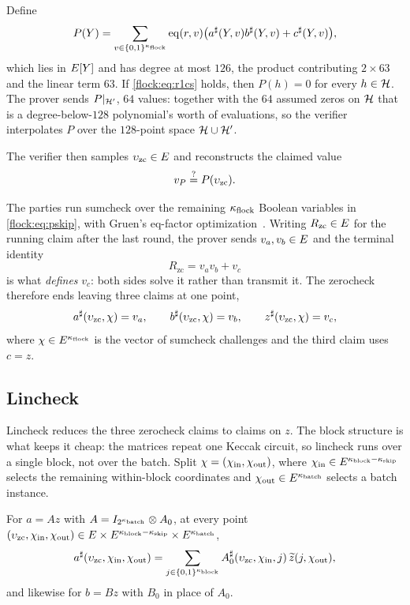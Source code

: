 Define
\begin{equation}\label{flock:eq:pskip}
P(Y)=\sum_{v\in\{0,1\}^{\kappa_{\mathrm{flock}}}}\operatorname{eq}(r,v)\bigl(a^{\sharp}(Y,v)b^{\sharp}(Y,v)+c^{\sharp}(Y,v)\bigr),
\end{equation}
which lies in $E[Y]$ and has degree at most $126$, the product contributing $2\times 63$ and the linear term $63$. If \eqref{flock:eq:r1cs} holds, then $P(h)=0$ for every $h\in\mathcal{H}$. The prover sends $P|_{\mathcal{H}'}$, $64$ values: together with the $64$ assumed zeros on $\mathcal{H}$ that is a degree-below-$128$ polynomial's worth of evaluations, so the verifier interpolates $P$ over the $128$-point space $\mathcal{H}\cup\mathcal{H}'$.

The verifier then samples $\upsilon_{\mathrm{zc}}\in E$ and reconstructs the claimed value
\[
v_P \stackrel{?}{=} P(\upsilon_{\mathrm{zc}}).
\]

The parties run sumcheck over the remaining $\kappa_{\mathrm{flock}}$ Boolean variables in \eqref{flock:eq:pskip}, with Gruen's eq-factor optimization~\cite{Gru24}. Writing $R_{\mathrm{zc}}\in E$ for the running claim after the last round, the prover sends $v_a,v_b\in E$ and the terminal identity
\begin{equation}\label{flock:eq:zc-terminal}
R_{\mathrm{zc}}=v_av_b+v_c
\end{equation}
is what \emph{defines} $v_c$: both sides solve it rather than transmit it. The zerocheck therefore ends leaving three claims at one point,
\begin{equation}\label{flock:eq:zc-claims}
a^{\sharp}(\upsilon_{\mathrm{zc}},\chi)=v_a,\qquad b^{\sharp}(\upsilon_{\mathrm{zc}},\chi)=v_b,\qquad z^{\sharp}(\upsilon_{\mathrm{zc}},\chi)=v_c,
\end{equation}
where $\chi\in E^{\kappa_{\mathrm{flock}}}$ is the vector of sumcheck challenges and the third claim uses $c=z$.

\subsection{Lincheck}\label{flock:lincheck}

Lincheck reduces the three zerocheck claims to claims on $z$. The block structure is what keeps it cheap: the matrices repeat one Keccak circuit, so lincheck runs over a single block, not over the batch. Split $\chi=(\chi_{\mathrm{in}},\chi_{\mathrm{out}})$, where $\chi_{\mathrm{in}}\in E^{\kappa_{\mathrm{block}}-\kappa_{\mathrm{skip}}}$ selects the remaining within-block coordinates and $\chi_{\mathrm{out}}\in E^{\kappa_{\mathrm{batch}}}$ selects a batch instance.

\begin{lemma}\label{lem:flock-block-diagonal}
For $a=Az$ with $A=I_{2^{\kappa_{\mathrm{batch}}}}\otimes A_0$, at every point $(\upsilon_{\mathrm{zc}},\chi_{\mathrm{in}},\chi_{\mathrm{out}})\in E\times E^{\kappa_{\mathrm{block}}-\kappa_{\mathrm{skip}}}\times E^{\kappa_{\mathrm{batch}}}$,
\[
a^{\sharp}(\upsilon_{\mathrm{zc}},\chi_{\mathrm{in}},\chi_{\mathrm{out}})=\sum_{j\in\{0,1\}^{\kappa_{\mathrm{block}}}}A^{\sharp}_0(\upsilon_{\mathrm{zc}},\chi_{\mathrm{in}},j)\,\widetilde{z}(j,\chi_{\mathrm{out}}),
\]
and likewise for $b=Bz$ with $B_0$ in place of $A_0$.
\end{lemma}

